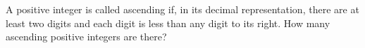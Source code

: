 A positive integer is called ascending if, in its decimal representation, there are at least two digits and each digit is less than any digit to its right. How many ascending positive integers are there?